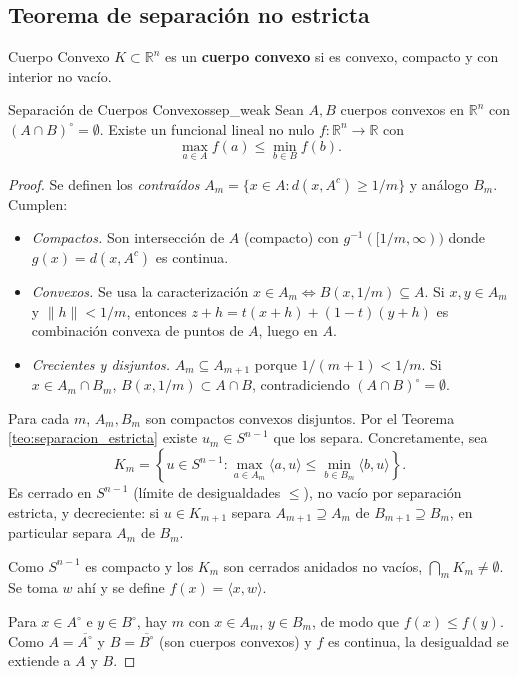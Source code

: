 \documentclass[11pt, a4paper]{article}
\begin{document}
\subsection{Teorema de separación no estricta}

\begin{definicion}{Cuerpo Convexo}{}
$K \subset \mathbb{R}^n$ es un \textbf{cuerpo convexo} si es convexo, compacto y con interior no
vacío.
\end{definicion}

\begin{teorema}{Separación de Cuerpos Convexos}{sep_weak}
Sean $A, B$ cuerpos convexos en $\mathbb{R}^n$ con $(A \cap B)^\circ = \emptyset$. Existe un
funcional lineal no nulo $f: \mathbb{R}^n \to \mathbb{R}$ con
$$ \max_{a \in A} f(a) \le \min_{b \in B} f(b). $$
\end{teorema}

\begin{proof}
Se definen los \emph{contraídos} $A_m = \{x \in A : d(x, A^c) \ge 1/m\}$ y análogo $B_m$.
Cumplen:
\begin{itemize}
    \item \textit{Compactos.} Son intersección de $A$ (compacto) con $g^{-1}([1/m, \infty))$ donde
    $g(x) = d(x, A^c)$ es continua.
    \item \textit{Convexos.} Se usa la caracterización $x \in A_m \iff B(x, 1/m) \subseteq A$. Si
    $x, y \in A_m$ y $\|h\| < 1/m$, entonces $z + h = t(x+h) + (1-t)(y+h)$ es combinación convexa
    de puntos de $A$, luego en $A$.
    \item \textit{Crecientes y disjuntos.} $A_m \subseteq A_{m+1}$ porque $1/(m+1) < 1/m$. Si
    $x \in A_m \cap B_m$, $B(x, 1/m) \subset A \cap B$, contradiciendo
    $(A \cap B)^\circ = \emptyset$.
\end{itemize}

Para cada $m$, $A_m, B_m$ son compactos convexos disjuntos. Por el Teorema \ref{teo:separacion_estricta} existe
$u_m \in S^{n-1}$ que los separa. Concretamente, sea
$$ K_m = \left\{ u \in S^{n-1} : \max_{a \in A_m} \langle a, u \rangle \le \min_{b \in B_m} \langle
b, u \rangle \right\}. $$
Es cerrado en $S^{n-1}$ (límite de desigualdades $\le$), no vacío por separación estricta, y
decreciente: si $u \in K_{m+1}$ separa $A_{m+1} \supseteq A_m$ de $B_{m+1} \supseteq B_m$, en
particular separa $A_m$ de $B_m$.

Como $S^{n-1}$ es compacto y los $K_m$ son cerrados anidados no vacíos,
$\bigcap_m K_m \ne \emptyset$. Se toma $w$ ahí y se define $f(x) = \langle x, w \rangle$.

Para $x \in A^\circ$ e $y \in B^\circ$, hay $m$ con $x \in A_m$, $y \in B_m$, de modo que
$f(x) \le f(y)$. Como $A = \overline{A^\circ}$ y $B = \overline{B^\circ}$ (son cuerpos convexos) y
$f$ es continua, la desigualdad se extiende a $A$ y $B$.
\end{proof}
\end{document}
